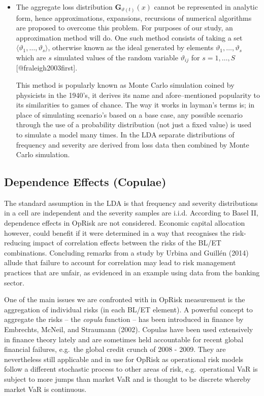 \documentclass[]{DissertateUSU}
\begin{document}
\begin{itemize}
\item The aggregate loss distribution \begin{math} \mathbf {G}_{\vartheta(t)}(x) \end{math} cannot be represented in analytic form, hence approximations, expansions, recursions of numerical algorithms are proposed to overcome this problem.  For purposes of our study, an approximation method will do. One such method consists of taking a set \begin{math} \langle \vartheta_1, \ldots , \vartheta_s \rangle \end{math}, otherwise known as the ideal generated by elements \begin{math} \vartheta_1, \ldots , \vartheta_s \end{math} which are $s$ simulated values of the random variable $\vartheta_{ij}$  for $s = 1,\ldots, S$ [@fraleigh2003first].\medskip

This method is popularly known as Monte Carlo simulation coined by physicists in the 1940's, it derives its name and afore--mentioned popularity to its similarities to games of chance. The way it works in layman's terms is; in place of simulating scenario's based on a base case, any possible scenario through the use of a probability distribution (not just a fixed value) is used to simulate a model many times. In the LDA separate distributions of frequency and severity are derived from loss data then combined by Monte Carlo simulation. 
\end{itemize}

\subsection{Dependence Effects (Copulae)}

The standard assumption in the LDA is that frequency and severity
distributions in a cell are independent and the severity samples are
i.i.d. According to Basel II, dependence effects in OpRisk are not
considered. Economic capital allocation however, could benefit if it
were determined in a way that recognises the risk-reducing impact of
correlation effects between the risks of the BL/ET combinations.
Concluding remarks from a study by Urbina and Guillén (2014) allude that
failure to account for correlation may lead to risk management practices
that are unfair, as evidenced in an example using data from the banking
sector. \medskip

One of the main issues we are confronted with in OpRisk measurement is
the aggregation of individual risks (in each BL/ET element). A powerful
concept to aggregate the risks -- the \emph{copula} function -- has been
introduced in finance by Embrechts, McNeil, and Straumann (2002).
Copulas have been used extensively in finance theory lately and are
sometimes held accountable for recent global financial failures,
e.g.~the global credit crunch of 2008 - 2009. They are nevertheless
still applicable and in use for OpRisk as operational risk models follow
a different stochastic process to other areas of risk, e.g.~operational
VaR is subject to more jumps than market VaR and is thought to be
discrete whereby market VaR is continuous. \medskip
\end{document}
